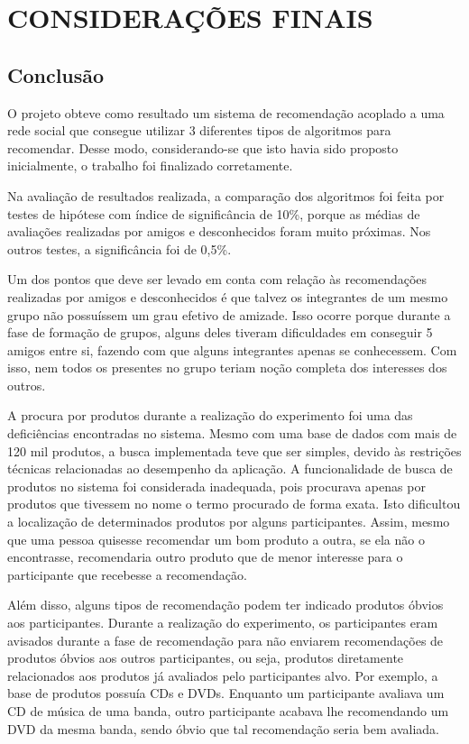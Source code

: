 \chapter{CONSIDERAÇÕES FINAIS} %
\label{cha:consideracoes_finais}

\section{Conclusão}
\label{conclusao}

 O projeto obteve como resultado um sistema de recomendação acoplado a uma rede social que consegue utilizar 3 diferentes tipos de algoritmos para recomendar. Desse modo, considerando-se que isto havia sido proposto inicialmente, o trabalho foi finalizado corretamente.

 Na avaliação de resultados realizada, a comparação dos algoritmos foi feita por testes de hipótese com índice de significância de 10\%, porque as médias de avaliações realizadas por amigos e desconhecidos foram muito próximas. Nos outros testes, a significância foi de 0,5\%.

  Um dos pontos que deve ser levado em conta com relação às recomendações realizadas por amigos e desconhecidos é que talvez os integrantes de um mesmo grupo não possuíssem um grau efetivo de amizade. Isso ocorre porque durante a fase de formação de grupos, alguns deles tiveram dificuldades em conseguir 5 amigos entre si, fazendo com que alguns integrantes apenas se conhecessem. Com isso, nem todos os presentes no grupo teriam noção completa dos interesses dos outros.

  A procura por produtos durante a realização do experimento foi uma das deficiências encontradas no sistema. Mesmo com uma base de dados com mais de 120 mil produtos, a busca implementada teve que ser simples, devido às restrições técnicas relacionadas ao desempenho da aplicação. A funcionalidade de busca de produtos no sistema foi considerada inadequada, pois procurava apenas por produtos que tivessem no nome o termo procurado de forma exata. Isto dificultou a localização de determinados produtos por alguns participantes. Assim, mesmo que uma pessoa quisesse recomendar um bom produto a outra, se ela não o encontrasse, recomendaria outro produto que de menor interesse para o participante que recebesse a recomendação.

  Além disso, alguns tipos de recomendação podem ter indicado produtos óbvios aos participantes. Durante a realização do experimento, os participantes eram avisados durante a fase de recomendação para não enviarem recomendações de produtos óbvios aos outros participantes, ou seja, produtos diretamente relacionados aos produtos já avaliados pelo participantes alvo. Por exemplo, a base de produtos possuía CDs e DVDs. Enquanto um participante avaliava um CD de música de uma banda, outro participante acabava lhe recomendando um DVD da mesma banda, sendo óbvio que tal recomendação seria bem avaliada.

